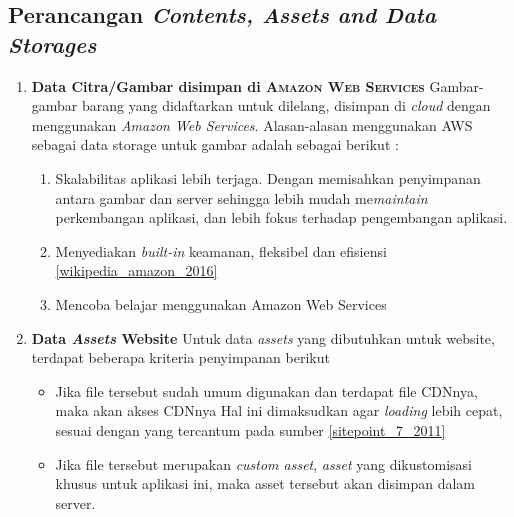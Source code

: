     
\subsection{Perancangan \textit{Contents, Assets and Data Storages}}

	\begin{enumerate}
	    \item \textbf{Data Citra/Gambar disimpan di \textsc{Amazon Web Services}} \newline
	    \indent Gambar-gambar barang yang didaftarkan untuk dilelang, disimpan di \textit{cloud} dengan menggunakan \textit{Amazon Web Services}. Alasan-alasan menggunakan AWS sebagai data storage untuk gambar adalah sebagai berikut :
	        \begin{enumerate}[noitemsep,topsep=0pt]
	        \item Skalabilitas aplikasi lebih terjaga. 
	        \newline Dengan memisahkan penyimpanan antara gambar dan server sehingga lebih mudah me\textit{maintain} perkembangan aplikasi, dan lebih fokus terhadap pengembangan aplikasi.
	        \item Menyediakan \textit{built-in} keamanan, fleksibel dan efisiensi \ref{wikipedia_amazon_2016}
	        \item Mencoba belajar menggunakan Amazon Web Services
	        \end{enumerate}
	        
	    \item \textbf{Data \textit{Assets} Website}
	    \newline
	    \indent Untuk data \textit{assets} yang dibutuhkan untuk website, terdapat beberapa kriteria penyimpanan berikut
	    
	      \begin{itemize}[noitemsep,topsep=0pt]
	      \item Jika file tersebut sudah umum digunakan dan terdapat file CDNnya, maka akan akses CDNnya
	      \newline
	      Hal ini dimaksudkan agar \textit{loading} lebih cepat, sesuai dengan yang tercantum pada sumber \ref{sitepoint_7_2011}
	      \item Jika file tersebut merupakan \textit{custom asset}, \textit{asset} yang dikustomisasi khusus untuk aplikasi ini, maka asset tersebut akan disimpan dalam server.
	      \end{itemize}
    \end{enumerate}